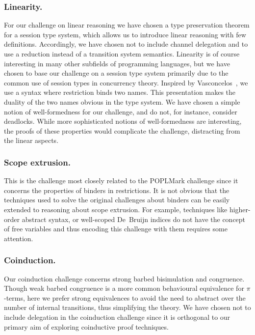 \documentclass[runningheads]{llncs}
\begin{document}
\subsubsection{Linearity.}
For our challenge on linear reasoning we have chosen a type preservation theorem
for a session type system, which allows us to introduce linear
reasoning with few definitions. Accordingly, we have chosen not to
include channel delegation and to use a reduction instead of a
transition system semantics.
Linearity is of course interesting in many other subfields of programming languages, but we have chosen to base our challenge on a session type system primarily due to the common use of session types in concurrency theory.
Inspired by Vasconcelos~\cite{Vasconcelos2012}, we use a syntax where
restriction binds two names. This presentation makes the duality
of the two names obvious in the type system.
We have chosen a simple notion of well-formedness for our challenge,
and do not, for instance, consider deadlocks. While more
sophisticated notions of well-formedness are interesting, the
proofs of these properties would complicate the challenge, distracting from the linear aspects.

\subsubsection{Scope extrusion.}
This is the challenge most closely related to the POPLMark
challenge since it concerns the properties of binders in restrictions.
It is not obvious that the techniques used to solve the original challenges about binders can be easily extended to reasoning about scope extrusion.
For example, techniques like higher-order abstract syntax, or well-scoped
De\ Bruijn indices do not have the concept of free variables and thus encoding this challenge with them requires some attention.

\subsubsection{Coinduction.}

Our coinduction challenge concerns strong barbed bisimulation and congruence.
Though weak barbed congruence is a more common behavioural equivalence for \(\pi\)-terms, here we prefer strong equivalences to avoid the need to abstract over the number of internal transitions, %
thus simplifying the theory.
We have chosen not to include delegation in the coinduction challenge since it is orthogonal to our primary aim of exploring coinductive proof techniques.
\end{document}
